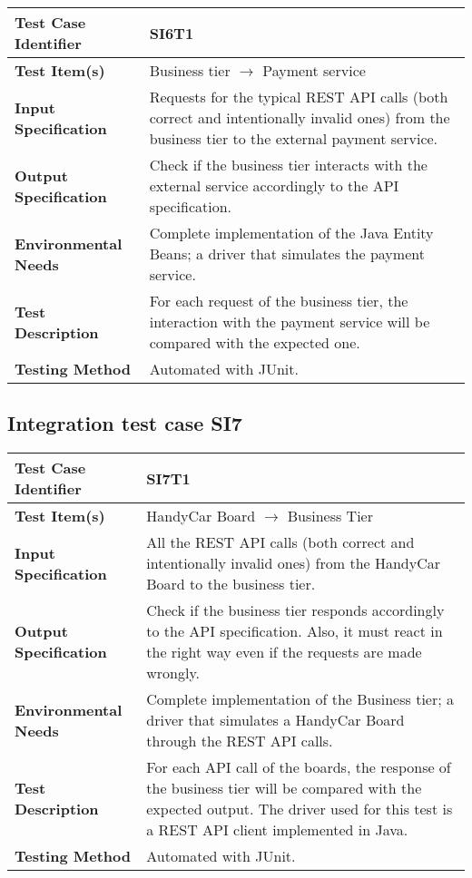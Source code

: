 \begin{tabular}{l p{}}
    \hline
    \textbf{Test Case Identifier} & SI6T1\\
    \hline
    \textbf{Test Item(s)} & Business tier $\rightarrow$ Payment service\\
    \hline
    \textbf{Input Specification} & Requests for the typical REST API calls (both correct and intentionally invalid ones) from the business tier to the external payment service.\\
    \hline
    \textbf{Output Specification} & Check if the business tier interacts with the external service accordingly to the API specification.\\
    \hline
    \textbf{Environmental Needs} & Complete implementation of the Java Entity Beans; a driver that simulates the payment service.\\
    \hline
    \textbf{Test Description} & For each request of the business tier, the interaction with the payment service will be compared with the expected one.\\
    \hline
    \textbf{Testing Method} & Automated with JUnit.\\
    \hline
\end{tabular}

\subsection{Integration test case SI7}
\label{sec:performance-business}

\begin{tabular}{l p{}}
    \hline
    \textbf{Test Case Identifier} & SI7T1\\
    \hline
    \textbf{Test Item(s)} & HandyCar Board $\rightarrow$ Business Tier\\
    \hline
    \textbf{Input Specification} & All the REST API calls (both correct and intentionally invalid ones) from the HandyCar Board to the business tier.\\
    \hline
    \textbf{Output Specification} & Check if the business tier responds accordingly to the API specification. Also, it must react in the right way even if the requests are made wrongly.\\
    \hline
    \textbf{Environmental Needs} & Complete implementation of the Business tier; a driver that simulates a HandyCar Board through the REST API calls. \\
    \hline
    \textbf{Test Description} & For each API call of the boards, the response of the business tier will be compared with the expected output. The driver used for this test is a REST API client implemented in Java.\\
    \hline
    \textbf{Testing Method} & Automated with JUnit.\\
    \hline
\end{tabular}

